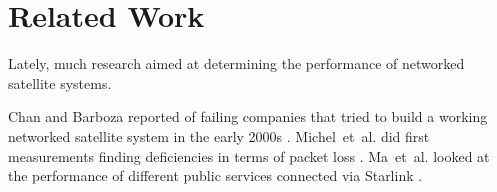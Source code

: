 \section{Related Work} \label{sec:related_work}

Lately, much research aimed at determining the performance of networked satellite systems.

Chan and Barboza reported of failing companies that tried to build a working networked satellite system in the early 2000s \cite{Chan2002, Barboza2000}.
Michel~et~al. did first measurements finding deficiencies in terms of packet loss \cite{DBLP:conf/imc/MichelTGB22}.
Ma~et~al. looked at the performance of different public services connected via Starlink \cite{DBLP:conf/infocom/MaCZCML23}.

